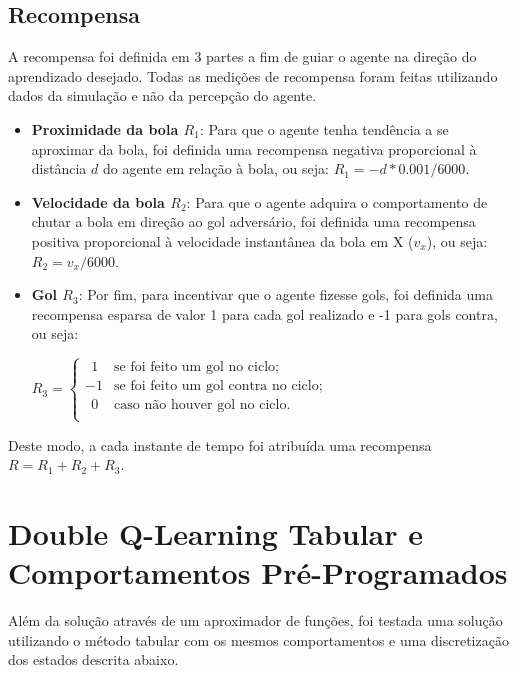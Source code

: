 \subsection{Recompensa}
\label{subsubsec:reward}

A recompensa foi definida em 3 partes a fim de guiar o agente na direção do aprendizado desejado. Todas as medições de recompensa foram feitas utilizando dados da simulação e não da percepção do agente.

\begin{itemize}
	\item \textbf{Proximidade da bola $R_1$}: Para que o agente tenha tendência a se aproximar da bola, foi definida uma recompensa negativa proporcional à distância $d$ do agente em relação à bola, ou seja: $R_1 = -d*0.001/6000$.
	
	\item \textbf{Velocidade da bola $R_2$}: Para que o agente adquira o comportamento de chutar a bola em direção ao gol adversário, foi definida uma recompensa positiva proporcional à velocidade instantânea da bola em X ($v_x$), ou seja: $R_2 = v_x/6000$.
	
	\item \textbf{Gol $R_3$}: Por fim, para incentivar que o agente fizesse gols, foi definida uma recompensa esparsa de valor 1 para cada gol realizado e -1 para gols contra, ou seja:
	
	$
	R_3 =
	\left\{
	\begin{array}{ll}
		\ \ 1  & \mbox{se foi feito um gol no ciclo}; \\
		-1  & \mbox{se foi feito um gol contra no ciclo}; \\
		\ \ 0  & \mbox{caso não houver gol no ciclo}. \\
	\end{array}
	\right.
	$
\end{itemize}

Deste modo, a cada instante de tempo foi atribuída uma recompensa $R = R_1 + R_2 + R_3$.

\section{Double Q-Learning Tabular e Comportamentos Pré-Programados}

Além da solução através de um aproximador de funções, foi testada uma solução utilizando o método tabular com os mesmos comportamentos e uma discretização dos estados descrita abaixo.

